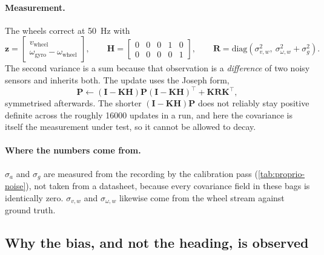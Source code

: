 \paragraph{Measurement.} The wheels correct at \SI{50}{\hertz} with
\begin{equation}
  \mathbf{z} = \begin{bmatrix}v_{\text{wheel}} \\
    \omega_{\text{gyro}} - \omega_{\text{wheel}}\end{bmatrix}, \qquad
  \mathbf{H} = \begin{bmatrix}0&0&0&1&0\\ 0&0&0&0&1\end{bmatrix}, \qquad
  \mathbf{R} = \mathrm{diag}\!\left(\sigma_{v,w}^2,\ \sigma_{\omega,w}^2+\sigma_g^2\right).
  \label{eq:ekf-update}
\end{equation}
The second variance is a sum because that observation is a \emph{difference} of
two noisy sensors and inherits both. The update uses the Joseph form,
\begin{equation}
  \mathbf{P} \leftarrow (\mathbf{I}-\mathbf{K}\mathbf{H})\mathbf{P}
    (\mathbf{I}-\mathbf{K}\mathbf{H})^{\top} + \mathbf{K}\mathbf{R}\mathbf{K}^{\top},
  \label{eq:ekf-joseph}
\end{equation}
symmetrised afterwards. The shorter $(\mathbf{I}-\mathbf{K}\mathbf{H})\mathbf{P}$
does not reliably stay positive definite across the roughly \num{16000} updates
in a run, and here the covariance is itself the measurement under test, so it
cannot be allowed to decay.

\paragraph{Where the numbers come from.} $\sigma_a$ and $\sigma_g$ are measured
from the recording by the calibration pass (\cref{tab:proprio-noise}), not taken
from a datasheet, because every covariance field in these bags is identically
zero. $\sigma_{v,w}$ and $\sigma_{\omega,w}$ likewise come from the wheel stream
against ground truth. 

\subsection{Why the bias, and not the heading, is observed}


